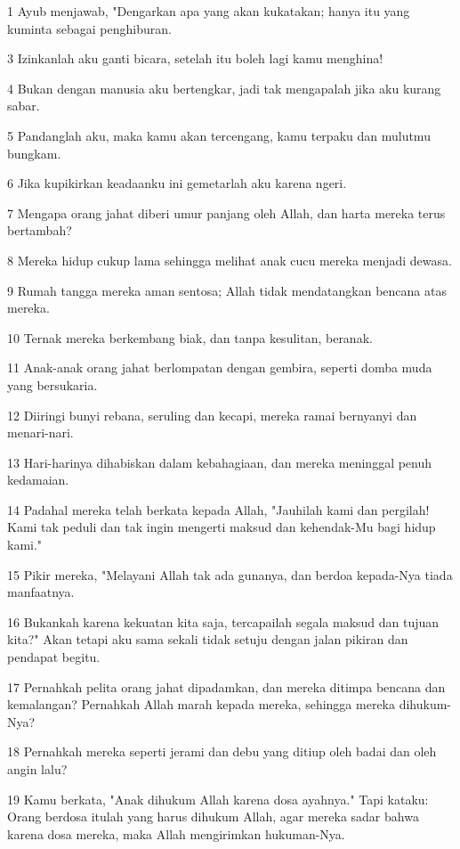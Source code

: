 \par 1 Ayub menjawab, "Dengarkan apa yang akan kukatakan; hanya itu yang kuminta sebagai penghiburan.
\par 3 Izinkanlah aku ganti bicara, setelah itu boleh lagi kamu menghina!
\par 4 Bukan dengan manusia aku bertengkar, jadi tak mengapalah jika aku kurang sabar.
\par 5 Pandanglah aku, maka kamu akan tercengang, kamu terpaku dan mulutmu bungkam.
\par 6 Jika kupikirkan keadaanku ini gemetarlah aku karena ngeri.
\par 7 Mengapa orang jahat diberi umur panjang oleh Allah, dan harta mereka terus bertambah?
\par 8 Mereka hidup cukup lama sehingga melihat anak cucu mereka menjadi dewasa.
\par 9 Rumah tangga mereka aman sentosa; Allah tidak mendatangkan bencana atas mereka.
\par 10 Ternak mereka berkembang biak, dan tanpa kesulitan, beranak.
\par 11 Anak-anak orang jahat berlompatan dengan gembira, seperti domba muda yang bersukaria.
\par 12 Diiringi bunyi rebana, seruling dan kecapi, mereka ramai bernyanyi dan menari-nari.
\par 13 Hari-harinya dihabiskan dalam kebahagiaan, dan mereka meninggal penuh kedamaian.
\par 14 Padahal mereka telah berkata kepada Allah, "Jauhilah kami dan pergilah! Kami tak peduli dan tak ingin mengerti maksud dan kehendak-Mu bagi hidup kami."
\par 15 Pikir mereka, "Melayani Allah tak ada gunanya, dan berdoa kepada-Nya tiada manfaatnya.
\par 16 Bukankah karena kekuatan kita saja, tercapailah segala maksud dan tujuan kita?" Akan tetapi aku sama sekali tidak setuju dengan jalan pikiran dan pendapat begitu.
\par 17 Pernahkah pelita orang jahat dipadamkan, dan mereka ditimpa bencana dan kemalangan? Pernahkah Allah marah kepada mereka, sehingga mereka dihukum-Nya?
\par 18 Pernahkah mereka seperti jerami dan debu yang ditiup oleh badai dan oleh angin lalu?
\par 19 Kamu berkata, "Anak dihukum Allah karena dosa ayahnya." Tapi kataku: Orang berdosa itulah yang harus dihukum Allah, agar mereka sadar bahwa karena dosa mereka, maka Allah mengirimkan hukuman-Nya.
